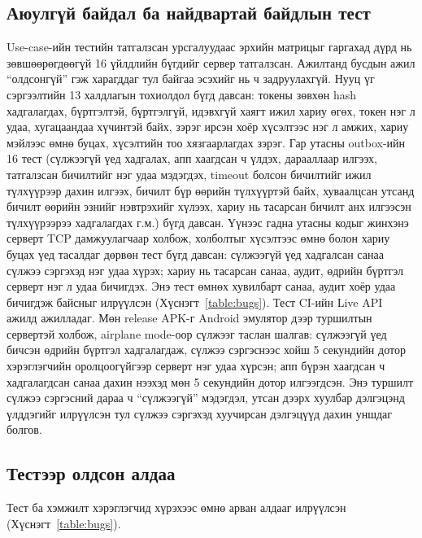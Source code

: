 \subsection{Аюулгүй байдал ба найдвартай байдлын тест}
Use-case-ийн тестийн татгалзсан урсгалуудаас эрхийн матрицыг гаргахад дүрд нь зөвшөөрөгдөөгүй 16 үйлдлийн бүгдийг сервер татгалзсан. Ажилтанд бусдын ажил ``олдсонгүй'' гэж харагддаг тул байгаа эсэхийг нь ч задруулахгүй. Нууц үг сэргээлтийн 13 халдлагын тохиолдол бүгд давсан: токены зөвхөн hash хадгалагдах, бүртгэлтэй, бүртгэлгүй, идэвхгүй хаягт ижил хариу өгөх, токен нэг л удаа, хугацаандаа хүчинтэй байх, зэрэг ирсэн хоёр хүсэлтээс нэг л амжих, хариу мэйлээс өмнө буцах, хүсэлтийн тоо хязгаарлагдах зэрэг. Гар утасны outbox-ийн 16 тест (сүлжээгүй үед хадгалах, апп хаагдсан ч үлдэх, дарааллаар илгээх, татгалзсан бичилтийг нэг удаа мэдэгдэх, timeout болсон бичилтийг ижил түлхүүрээр дахин илгээх, бичилт бүр өөрийн түлхүүртэй байх, хуваалцсан утсанд бичилт өөрийн эзнийг нэвтрэхийг хүлээх, хариу нь тасарсан бичилт анх илгээсэн түлхүүрээрээ хадгалагдах г.м.) бүгд давсан. Үүнээс гадна утасны кодыг жинхэнэ серверт TCP дамжуулагчаар холбож, холболтыг хүсэлтээс өмнө болон хариу буцах үед тасалдаг дөрвөн тест бүгд давсан: сүлжээгүй үед хадгалсан санаа сүлжээ сэргэхэд нэг удаа хүрэх; хариу нь тасарсан санаа, аудит, өдрийн бүртгэл серверт нэг л удаа бичигдэх. Энэ тест өмнөх хувилбарт санаа, аудит хоёр удаа бичигдэж байсныг илрүүлсэн (Хүснэгт~\ref{table:bugs}). Тест CI-ийн Live API ажилд ажилладаг. Мөн release APK-г Android эмулятор дээр туршилтын сервертэй холбож, airplane mode-оор сүлжээг таслан шалгав: сүлжээгүй үед бичсэн өдрийн бүртгэл хадгалагдаж, сүлжээ сэргэснээс хойш 5 секундийн дотор хэрэглэгчийн оролцоогүйгээр серверт нэг удаа хүрсэн; апп бүрэн хаагдсан ч хадгалагдсан санаа дахин нээхэд мөн 5 секундийн дотор илгээгдсэн. Энэ туршилт сүлжээ сэргэсний дараа ч ``сүлжээгүй'' мэдэгдэл, утсан дээрх хуулбар дэлгэцэнд үлддэгийг илрүүлсэн тул сүлжээ сэргэхэд хуучирсан дэлгэцүүд дахин уншдаг болгов.

\subsection{Тестээр олдсон алдаа}
Тест ба хэмжилт хэрэглэгчид хүрэхээс өмнө арван алдааг илрүүлсэн (Хүснэгт~\ref{table:bugs}).

